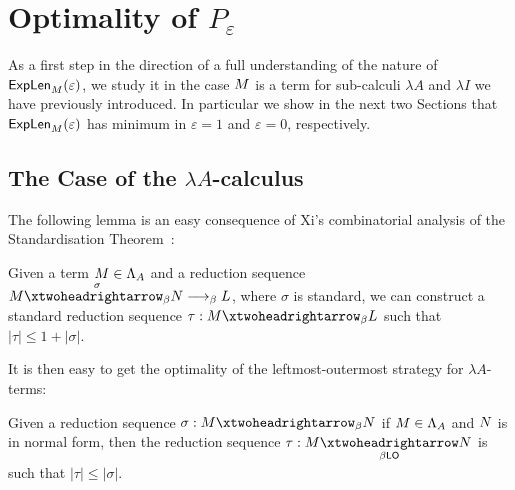 \section{Optimality of $P_\varepsilon$}
As a first step in the direction of a full understanding of the nature
of $\textsf{ExpLen}_{M}(\varepsilon)$, we study it in the
case $M$ is a term for sub-calculi $\lambda A$ and
$\lambda I$ we have previously introduced. In particular we show in the
next two Sections that $\textsf{ExpLen}_{M}(\varepsilon)$ has minimum
in $\varepsilon=1$ and $\varepsilon=0$, respectively.
\subsection{The Case of the $\lambda A$-calculus}\label{sec:lambdaA}
The following lemma is an easy consequence of Xi's combinatorial
analysis of the Standardisation Theorem~\cite{xi_upper_1999}:
\begin{lemma}\label{lemma:redbound}
	Given a term $M\in\Lambda_A$ and a reduction sequence $\termone\redbetared{\sigma}
	\termtwo \redbeta \termthree$, where $\sigma$ is standard, we can construct
	a standard reduction sequence
	$\tau:\termone\redbetared{} \termthree$ such that $|\tau|\leq
	1+|\sigma|$.
\end{lemma}
It is then easy to get the optimality of the leftmost-outermost
strategy for $\lambda A$-terms:
\begin{theorem}\label{theorem:stdla}
	Given a reduction sequence
	$\sigma:\termone \redbetared{} \termtwo$
	if $M\in\Lambda_A$ and $N$ is in normal form, then the
	reduction sequence $\tau:\termone\redbetaredlo{} \termtwo$ is
	such that $|\tau|\leq |\sigma|$.
\end{theorem}
